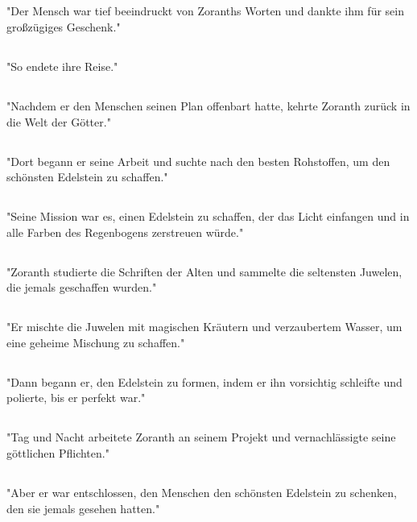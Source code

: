 \documentclass{article}
\begin{document}
\subsection{}
"Der Mensch war tief beeindruckt von Zoranths Worten und dankte ihm für sein großzügiges Geschenk."
\subsection{}
"So endete ihre Reise."
\subsection{}
"Nachdem er den Menschen seinen Plan offenbart hatte, kehrte Zoranth zurück in die Welt der Götter."
\subsection{}
"Dort begann er seine Arbeit und suchte nach den besten Rohstoffen, um den schönsten Edelstein zu schaffen."
\subsection{}
"Seine Mission war es, einen Edelstein zu schaffen, der das Licht einfangen und in alle Farben des Regenbogens zerstreuen würde."
\subsection{}
"Zoranth studierte die Schriften der Alten und sammelte die seltensten Juwelen, die jemals geschaffen wurden."
\subsection{}
"Er mischte die Juwelen mit magischen Kräutern und verzaubertem Wasser, um eine geheime Mischung zu schaffen."
\subsection{}
"Dann begann er, den Edelstein zu formen, indem er ihn vorsichtig schleifte und polierte, bis er perfekt war."
\subsection{}
"Tag und Nacht arbeitete Zoranth an seinem Projekt und vernachlässigte seine göttlichen Pflichten."
\subsection{}
"Aber er war entschlossen, den Menschen den schönsten Edelstein zu schenken, den sie jemals gesehen hatten."
\end{document}
